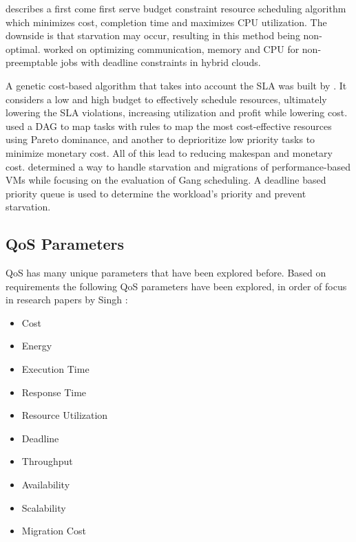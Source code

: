 \documentclass[12pt]{article}
\begin{document}
\textcite{ana2010} describes a first come first serve budget constraint resource scheduling algorithm which minimizes cost, completion time and maximizes CPU utilization. The downside is that starvation may occur, resulting in this  method being non-optimal.
\textcite{van2010cost} worked on optimizing communication, memory and CPU for non-preemptable jobs with deadline constraints in hybrid clouds.

A genetic cost-based algorithm that takes into account the SLA was built by \textcite{liu2013cost}. It considers a low and high budget to effectively schedule resources, ultimately lowering the SLA violations, increasing utilization and profit while lowering cost.
\textcite{su2013cost} used a DAG to map tasks with rules to map the most cost-effective resources using Pareto dominance, and another to deprioritize low priority tasks to minimize monetary cost. All of this lead to reducing makespan and monetary cost.
\textcite{ioannis2011cost} determined a way to handle starvation and migrations of performance-based VMs while focusing on the evaluation of Gang scheduling. A deadline based priority queue is used to determine the workload's priority and prevent starvation.



\subsection{QoS Parameters} \label{sub:schedQosParams}

QoS has many unique parameters that have been explored before. Based on requirements the following QoS parameters have been explored, in order of focus in research papers by Singh \cite{Singh2016}:
\begin{itemize}
    \item Cost
    \item Energy
    \item Execution Time
    \item Response Time
    \item Resource Utilization
    \item Deadline
    \item Throughput
    \item Availability
    \item Scalability
    \item Migration Cost
\end{itemize}
\end{document}
